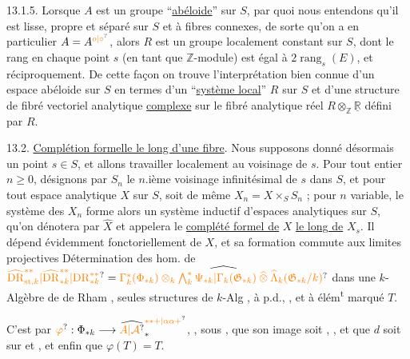 13.1.5. Lorsque $A$ est un groupe ``\uline{abéloide}'' sur $S$, par quoi nous entendons qu'il est lisse, propre et séparé sur $S$ et à fibres connexes, de sorte qu'on a en particulier $A=A^{\unsure{o|\circ}}$, alors $R$ est un groupe localement constant sur $S$, dont le rang en chaque point $s$ (en tant que $\mathbb Z$-module) est égal à $2\operatorname{rang}_s(E)$, et réciproquement. De cette façon on trouve l'interprétation bien connue d'un espace abéloide sur $S$ en termes d'un ``\uline{système local}'' $R$ sur $S$ et d'une structure de fibré vectoriel analytique \uline{complexe} sur le fibré analytique réel $R\otimes_{\mathbb Z}\underline{\mathbb R}$ défini par $R$.

13.2. \uline{Complétion formelle le long d'une fibre}. Nous supposons donné désormais un point $s\in S$, et allons travailler localement au voisinage de $s$. Pour tout entier $n\geq0$, désignons par $S_n$ le $n$.ième voisinage infinitésimal de $s$ dans $S$, et pour tout espace analytique $X$ sur $S$, soit de même $X_n=X\times_S S_n$ ; pour $n$ variable, le système des $X_n$ forme alors un système inductif d'espaces analytiques sur $S$, qu'on dénotera par $\hat X$ et appelera le \uline{complété formel de} $X$ \uline{le long de} $X_s$. Il dépend évidemment fonctoriellement de $X$, et sa formation commute aux limites projectives
Détermination des hom.   de $\unsure{\widehat{\mathrm{DR}}_{\mathrm{st},k}^{**}|\widehat{\mathrm{DR}}_{*k}^{**}|\mathrm{DR}_{*k}^{**}}=
\widehat{\unsure{\Gamma_k^*(\Phi_{*k})\otimes_k\bigwedge_k^*\Psi_{*k}|\Gamma_k(\mathfrak G_{*k})\mathbin{\widehat\otimes}\widehat\Lambda_k(\mathfrak G_{*k}/k)}}$ dans une $k$-Algèbre de de Rham ,  seules structures de $k$-Alg , à p.d., , et à élém\textsuperscript{t} marqué $T$.

C'est  par $\unsure{\varphi}:\Phi_{*k}\longrightarrow\widehat{\unsure{A|\mathcal A}}_*^{\unsure{**+|\alpha\alpha+}}$, , sous  , que son image  soit , , et que $d$ soit  sur  et   , et enfin que $\varphi(T)=T$.


